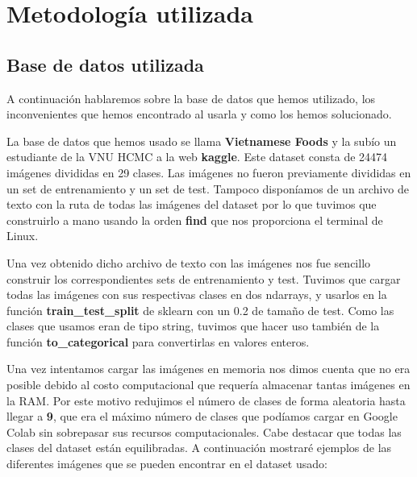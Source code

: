 \section{Metodología utilizada}


\subsection{Base de datos utilizada}

\vspace{5 mm}

A continuación hablaremos sobre la base de datos que hemos utilizado, los inconvenientes que hemos encontrado al usarla y como los hemos solucionado.

La base de datos que hemos usado se llama \textbf{Vietnamese Foods} y la subío un estudiante de la VNU HCMC a la web \textbf{kaggle}. Este dataset consta de 24474 imágenes divididas en 29 clases. Las imágenes no fueron previamente divididas en un set de entrenamiento y un set de test. Tampoco disponíamos de un archivo de texto con la ruta de todas las imágenes del dataset por lo que tuvimos que construirlo a mano usando la orden \textbf{find} que nos proporciona el terminal de Linux.

Una vez obtenido dicho archivo de texto con las imágenes nos fue sencillo construir los correspondientes sets de entrenamiento y test. Tuvimos que cargar todas las imágenes con sus respectivas clases en dos ndarrays, y usarlos en la función \textbf{train\_test\_split} de sklearn con un 0.2 de tamaño de test. Como las clases que usamos eran de tipo string, tuvimos que hacer uso también de la función \textbf{to\_categorical} para convertirlas en valores enteros.

Una vez intentamos cargar las imágenes en memoria nos dimos cuenta que no era posible debido al costo computacional que requería almacenar tantas imágenes en la RAM. Por este motivo redujimos el número de clases de forma aleatoria hasta llegar a \textbf{9}, que era el máximo número de clases que podíamos cargar en Google Colab sin sobrepasar sus recursos computacionales. Cabe destacar que todas las clases del dataset están equilibradas. A continuación mostraré ejemplos de las diferentes imágenes que se pueden encontrar en el dataset usado:

\vspace{5 mm}

